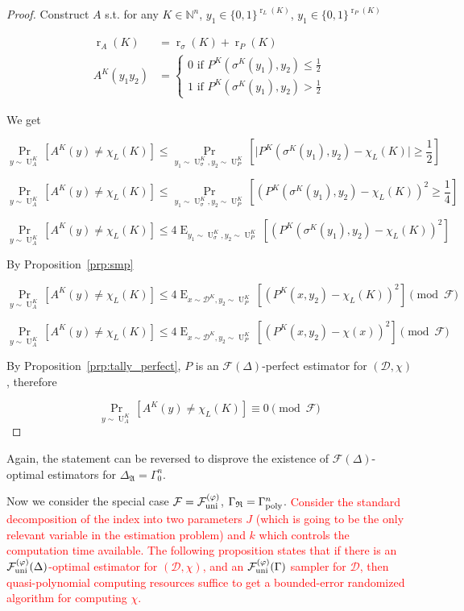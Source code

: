 \documentclass[11pt]{article}
\numberwithin{equation}{section}
\theoremstyle{definition}
\theoremstyle{plain}
\newcommand{\Bool}{\{0,1\}}
\DeclareMathOperator{\Prb}{Pr}
\DeclareMathOperator{\E}{E}
\DeclareMathOperator{\R}{r}
\DeclareMathOperator{\Un}{U}
\newcommand{\Nats}{\mathbb{N}}
\newcommand{\Abs}[1]{\lvert #1 \rvert}
\newcommand{\Dist}{\mathcal{D}}
\newcommand{\GrowR}{\Gamma_{\mathfrak{R}}}
\newcommand{\Fall}{\mathcal{F}}
\newcommand{\BoolR}[1]{\Bool^{\R_{#1}(K)}}
\newcommand{\GammaPoly}{\Gamma_{\textnormal{poly}}}
\newcommand{\FallUt}[1]{{\Fall_{\textnormal{uni}}^{(#1)}}}
\begin{document}
\begin{proof}

Construct ${A}$ s.t. for any ${K \in \Nats^n}$, ${y_1 \in \BoolR{L}}$, ${y_1 \in \BoolR{P}}$

\begin{align*}
\R_A(K) &= \R_\sigma(K)+\R_P(K) \\
A^K(y_1 y_2) &= \begin{cases}0 \text{ if } P^K(\sigma^K(y_1),y_2) \leq \frac{1}{2} \\ 1 \text{ if } P^K(\sigma^K(y_1),y_2) > \frac{1}{2} \end{cases}
\end{align*}

We get

\[\Prb_{y \sim \Un_A^K}[A^K(y) \neq \chi_L(K)] \leq \Prb_{y_1 \sim \Un_\sigma^K,y_2 \sim \Un_P^K}\left[\Abs{P^K(\sigma^K(y_1),y_2) - \chi_L(K)} \geq \frac{1}{2}\right]\]

\[\Prb_{y \sim \Un_A^K}[A^K(y) \neq \chi_L(K)] \leq \Prb_{y_1 \sim \Un_\sigma^K,y_2 \sim \Un_P^K}\left[(P^K(\sigma^K(y_1),y_2) - \chi_L(K))^2 \geq \frac{1}{4}\right]\]

\[\Prb_{y \sim \Un_A^K}[A^K(y) \neq \chi_L(K)] \leq 4 \E_{y_1 \sim \Un_\sigma^K,y_2 \sim \Un_P^K}[(P^K(\sigma^K(y_1),y_2) - \chi_L(K))^2]\]

By Proposition~\ref{prp:smp}

\[\Prb_{y \sim \Un_A^K}[A^K(y) \neq \chi_L(K)] \leq 4 \E_{x \sim \Dist^K,y_2 \sim \Un_P^K}[(P^K(x,y_2) - \chi_L(K))^2] \pmod \Fall\]

\[\Prb_{y \sim \Un_A^K}[A^K(y) \neq \chi_L(K)] \leq 4 \E_{x \sim \Dist^K,y_2 \sim \Un_P^K}[(P^K(x,y_2) - \chi(x))^2] \pmod \Fall\]

By Proposition~\ref{prp:tally_perfect}, ${P}$ is an ${\Fall(\Delta)}$-perfect estimator for ${(\Dist,\chi)}$, therefore

\[\Prb_{y \sim \Un_A^K}[A^K(y) \neq \chi_L(K)] \equiv 0 \pmod \Fall\]
%
\end{proof}

Again, the statement can be reversed to disprove the existence of ${\Fall(\Delta)}$-optimal estimators for ${\Delta_{\mathfrak{A}}}=\Gamma_0^n$.

Now we consider the special case ${\Fall=\FallUt{\varphi}}$, ${\GrowR = \GammaPoly^n}$. \textcolor{red}{Consider the standard decomposition of the index into two parameters $J$ (which is going to be the only relevant variable in the estimation problem) and $k$ which controls the computation time available. The following proposition states that if there is an $\FallUt{\varphi}(\Delta)$-optimal estimator for $(\Dist,\chi)$, and an $\FallUt{\varphi}(\Gamma)$ sampler for $\Dist$, then quasi-polynomial computing resources suffice to get a bounded-error randomized algorithm for computing $\chi$.}
\end{document}
